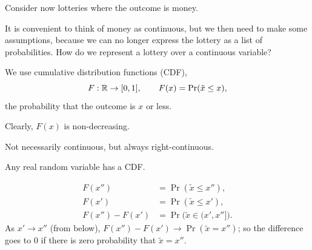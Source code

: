 \documentclass[11pt]{article}
\begin{document}
Consider now lotteries where the outcome is money.

It is convenient to think of money as continuous, but we then need to make some
assumptions, because we can no longer express the lottery as a list of
probabilities. How do we represent a lottery over a continuous variable?

We use cumulative distribution functions (CDF),
\[ F:\mathbb{R}\to[0,1], \qquad F(x)=\Pr(\tilde x\le x), \]
the probability that the outcome is $x$ or less.
\begin{flatlist}
  \item Clearly, $F(x)$ is non-decreasing.
  \item Not necessarily continuous, but always right-continuous.
  \item Any real random variable has a CDF.
\end{flatlist}

\begin{center}
\end{center}
\begin{align*}
  F(x'') &= \Pr(\tilde x\le x''),\\
  F(x')  &= \Pr(\tilde x\le x'),\\
  F(x'')-F(x') &= \Pr\bigl(\tilde x\in(x',x'']\bigr).
\end{align*}
As $x'\to x''$ (from below), $F(x'')-F(x')\to\Pr(\tilde x=x'')$; so the difference goes
to $0$ if there is zero probability that $\tilde x=x''$.
\end{document}
